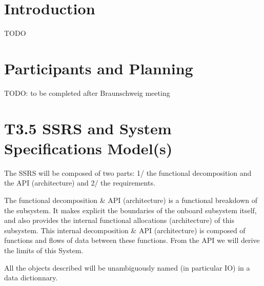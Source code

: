 \documentclass{template/openetcs_article}
\begin{document}
\newenvironment{inoutput}
{\vspace{2mm}
\noindent
\begin{tabular}{|r|p{.68\linewidth}|l|}
\hline}
{
\hline
\end{tabular}}

\section*{Introduction}

TODO

\section{Participants and Planning}


TODO: to be completed after Braunschweig meeting

\section{T3.5 SSRS and System Specifications Model(s)}


The SSRS will be composed of two parts: 1/ the functional decomposition and the API (architecture) and 2/ the requirements. 

The functional decomposition \& API (architecture) is a functional breakdown of the subsystem. It makes explicit the boundaries of the onboard subsystem itself, and also provides the internal functional allocations (architecture) of this subsystem. This internal decomposition \& API (architecture) is composed of functions and flows of data between these functions. From the API we will derive the limits of this System. 

All the objects described will be unambiguously named (in particular I\/O) in a data dictionnary. 
\end{document}
